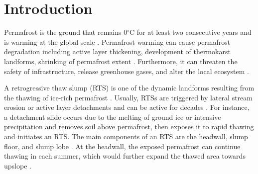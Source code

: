 \documentclass[authoryear,preprint,review,12pt]{elsarticle}
\begin{document}

\section{Introduction}
\label{sec_intro}

Permafrost is the ground that remains 0$^\circ$C for at least two consecutive years and is warming at the global scale \citep{biskaborn2019permafrost}. 
Permafrost warming can cause permafrost degradation including active layer thickening, development of thermokarst landforms, shrinking of permafrost extent \citep{czudek_thermokarst_1970,jorgenson_response_2005,osterkamp2007Characteristics,aakerman2008thawing,zhao2010Thermal}. 
Furthermore, it can threaten the safety of infrastructure, release greenhouse gases, and alter the local ecosystem \citep{tong_effect_1996,yang2010permafrost,bowden2010climate,grosse_vulnerability_2011,vonk2015reviews,schuur_climate_2015,olefeldt_circumpolar_2016,schuster2018permafrost,hjort2018degrading}.


A retrogressive thaw slump (RTS) is one of the dynamic landforms resulting from the thawing of ice-rich permafrost \citep{czudek_thermokarst_1970, jorgenson_thermokarst_2013,farquharson2016spatial,jones2019rapid}. 
Usually, RTSs are triggered by lateral stream erosion or active layer detachments \citep{french2017periglacial} and can be active for decades \citep{burn1989geomorphology, lacelle2010climatic, swanson2018growth}. 
For instance, a detachment slide occurs due to the melting of ground ice or intensive precipitation and removes soil above permafrost, then exposes it to rapid thawing and initiates an RTS. 
The main components of an RTS are the headwall, slump floor, and slump lobe \citep{lantuit_fifty_2008}. 
At the headwall, the exposed permafrost can continue thawing in each summer, which would further expand the thawed area towards upslope \citep{french2017periglacial}. 
\end{document}
